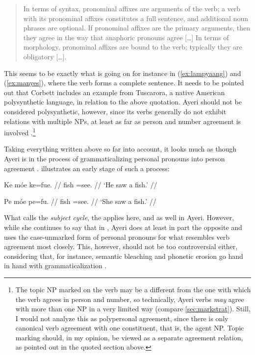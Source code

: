 \blockcquote[99--100]{corbett2006}{In terms of syntax, pronominal affixes are
arguments of the verb; a verb with its pronominal affixes constitutes a full
sentence, and additional noun phrases are optional. If pronominal affixes are
the primary arguments, then they agree in the way that anaphoric pronouns agree
[…] In terms of morphology, pronominal affixes are bound to the verb; typically
they are obligatory […].}

\noindent This seems to be exactly what is going on for instance in
(\ref{ex:lampyaang}) and (\ref{ex:manyes}), where the verb forms a complete
sentence. It needs to be pointed out that Corbett includes an example from
Tuscarora, a native American polysynthetic language, in relation to the above
quotation. Ayeri should not be considered polysynthetic, however, since its
verbs generally do not exhibit relations with multiple NPs, at least as far as
person and number agreement is involved
\citep[45--46]{comrie1989}.\footnote{The topic NP marked on the verb may be a
different from the one with which the verb agrees in person and number, so
technically, Ayeri verbs \emph{may} agree with more than one NP in a very
limited way (compare \autoref{sec:markstrat}). Still, I would not analyze this
as polypersonal agreement, since there is only canonical verb agreement with
one constituent, that is, the agent NP. Topic marking should, in my opinion, be
viewed as a separate agreement relation, as pointed out in the quoted section
above.}

Taking everything written above so far into account, it looks much as though 
Ayeri is in the process of grammaticalizing personal pronouns into person 
agreement \parencites[42--45]{lehmann2015}[493--497]{vangelderen2011}. 
\citet[76--77]{corbett2006} illustrates an early stage of such a process:

\pex %
\a\begingl{}%
	\gla Ke móe ke=fue.  //
	\glb \TsgM{} fish \TsgM{}=​see.\TsgM{} {} //
	\glft `He saw a fish.' //
\endgl

\a\begingl
	\gla Pe móe pe=fu.  //
	\glb \TsgF{} fish \TsgF{}=​see.\TsgF{} {} //
	\glft `She saw a fish.' //
\endgl

\xe

What \citet{vangelderen2011} calls the \emph{subject cycle}, the
 applies here, and as well in
Ayeri. However, while she continues to say that in
, Ayeri does at least in
part the opposite and uses the case-unmarked form of personal pronouns for
what resembles verb agreement most closely. This, however, should not be too
controversial either, considering that, for instance, semantic bleaching and
phonetic erosion go hand in hand with grammaticalization 
\parencites[136--137]{lehmann2015}[497]{vangelderen2011}.

